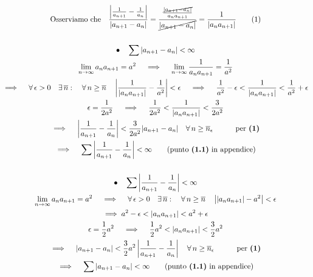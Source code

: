 \documentclass[11pt,reqno]{amsart}
\begin{document}
\begin{gather*}
 \text{Osserviamo che} \quad \frac{\left|\frac{1}{a_{n+1}}-\frac{1}{a_n}\right|}{|a_{n+1} - a_n|} = \frac{\frac{\cancel{|a_{n+1}-a_n|}}{a_na_{n+1}}}{\cancel{|a_{n+1}-a_n|}} = \frac{1}{|a_na_{n+1}|} \tag{1}\\\\
 \bullet \quad \sum |a_{n+1} - a_n| < \infty\\
 \lim_{n \to \infty} a_na_{n+1} = a^2 \quad \implies \quad \lim_{n \to \infty} \frac{1}{a_na_{n+1}} = \frac{1}{a^2}\\
 \implies \quad \forall \, \epsilon > 0 \quad \exists \, \overline{n}: \quad \forall \, n \geq \overline{n} \quad \left|\frac{1}{|a_na_{n+1}|} - \frac{1}{a^2}\right| < \epsilon \quad \implies \quad \frac{1}{a^2} - \epsilon < \frac{1}{|a_na_{n+1}|} < \frac{1}{a^2} + \epsilon\\
 \epsilon = \frac{1}{2a^2} \quad \implies \quad \frac{1}{2a^2} < \frac{1}{|a_na_{n+1}|} < \frac{3}{2a^2}\\
 \implies \quad \left|\frac{1}{a_{n+1}}-\frac{1}{a_n}\right| < \frac{3}{2a^2}|a_{n+1} - a_n| \quad \forall \, n \geq \overline{n}_{\epsilon} \quad \quad \quad \text{per } \textbf{(1)}\\
 \implies \quad \sum \left|\frac{1}{a_{n+1}}-\frac{1}{a_n}\right| < \infty \quad \quad \text{(punto } \textbf{(1.1)} \text{ in appendice)}\\\\
 \bullet \quad \sum \left|\frac{1}{a_{n+1}}-\frac{1}{a_n}\right| < \infty\\
 \lim_{n \to \infty} a_na_{n+1} = a^2 \quad \implies \quad \forall \, \epsilon > 0 \quad \exists \, \overline{n}: \quad \forall \, n \geq \overline{n} \quad \left||a_na_{n+1}| - a^2\right| < \epsilon\\
 \implies a^2 - \epsilon < |a_na_{n+1}| < a^2 + \epsilon\\
 \epsilon = \frac{1}{2}a^2 \quad \implies \quad \frac{1}{2}a^2 < |a_na_{n+1}| < \frac{3}{2}a^2\\
 \implies \quad |a_{n+1} - a_n| < \frac{3}{2}a^2\left|\frac{1}{a_{n+1}}-\frac{1}{a_n}\right| \quad \forall \, n \geq \overline{n}_{\epsilon} \quad \quad \quad \text{per } \textbf{(1)}\\
 \implies \quad \sum |a_{n+1} - a_n| < \infty \quad \quad \text{(punto } \textbf{(1.1)} \text{ in appendice)}\\
\end{gather*}

\newpage
\end{document}
